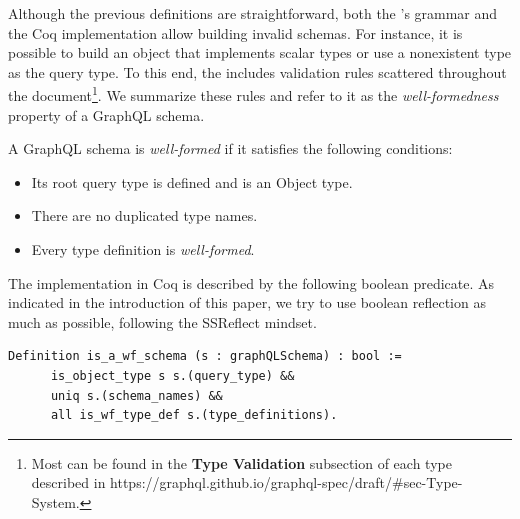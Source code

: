 
Although the previous definitions are straightforward, both the \spec{}'s grammar and the Coq implementation allow building invalid schemas. For instance, it is possible to build an object that implements scalar types or use a nonexistent type as the query type. To this end, the \spec{} includes validation rules scattered throughout the document\footnote{Most can be found in the \textbf{Type Validation} subsection of each type described in https://graphql.github.io/graphql-spec/draft/\#sec-Type-System.}.  We summarize these rules and refer to it as the \textit{well-formedness} property of a GraphQL schema.


\begin{definition}
A GraphQL schema is \textit{well-formed} if it satisfies the following conditions:
\begin{itemize}
    \item Its root query type is defined and is an Object type.
    \item There are no duplicated type names.
    \item Every type definition is \textit{well-formed}.
\end{itemize}
\end{definition}

The implementation in Coq is described by the following boolean predicate. As indicated in the introduction of this paper, we try to use boolean reflection as much as possible, following the SSReflect mindset.

\begin{verbatim}
Definition is_a_wf_schema (s : graphQLSchema) : bool :=
      is_object_type s s.(query_type) &&
      uniq s.(schema_names) &&
      all is_wf_type_def s.(type_definitions).
\end{verbatim}

